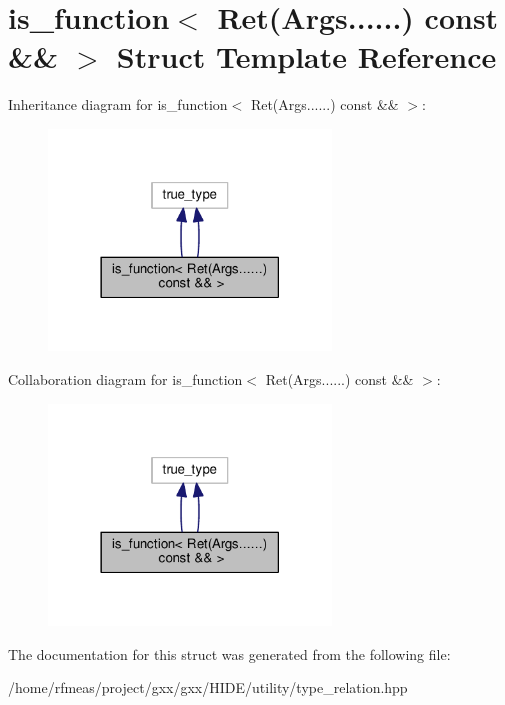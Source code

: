 \hypertarget{structis__function_3_01Ret_07Args_8_8_8_8_8_8_08_01const_01_6_6_01_4}{}\section{is\+\_\+function$<$ Ret(Args......) const \&\& $>$ Struct Template Reference}
\label{structis__function_3_01Ret_07Args_8_8_8_8_8_8_08_01const_01_6_6_01_4}


Inheritance diagram for is\+\_\+function$<$ Ret(Args......) const \&\& $>$\+:
\nopagebreak
\begin{figure}[H]
\begin{center}
\leavevmode
\includegraphics[width=213pt]{structis__function_3_01Ret_07Args_8_8_8_8_8_8_08_01const_01_6_6_01_4__inherit__graph}
\end{center}
\end{figure}


Collaboration diagram for is\+\_\+function$<$ Ret(Args......) const \&\& $>$\+:
\nopagebreak
\begin{figure}[H]
\begin{center}
\leavevmode
\includegraphics[width=213pt]{structis__function_3_01Ret_07Args_8_8_8_8_8_8_08_01const_01_6_6_01_4__coll__graph}
\end{center}
\end{figure}


The documentation for this struct was generated from the following file\+:\begin{DoxyCompactItemize}
\item 
/home/rfmeas/project/gxx/gxx/\+H\+I\+D\+E/utility/type\+\_\+relation.\+hpp\end{DoxyCompactItemize}
